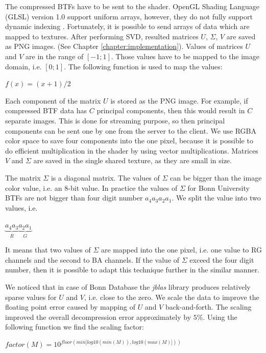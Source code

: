 The compressed BTFs  have to be sent to the shader. 
  OpenGL Shading Language (GLSL) version 1.0 support uniform arrays, however, they do not fully support dynamic indexing  \cite{glsl}.
Fortunately, it is possible to send arrays of data which are mapped to textures. 
After performing SVD, resulted matrices $U$, $\Sigma$, $V$ are saved as PNG images. (See Chapter \ref{chapter:implementation}).
Values of matrices $U$ and $V$ are in the range of $[-1;1]$.
 Those values have to be mapped to the image domain, i.e. $[0;1]$.
The following function is used to map the values:  

{\centering$f(x)=(x+1)/2$\\}


 Each component of the matrix $U$ is stored as the PNG image.
 For example, if compressed BTF data has $C$ principal components, then this would result in $C$ separate images.
 This is done for streaming purpose, so then principal components can be sent one by one from the server to the client.
 We use  RGBA color space to save four components into the one pixel, because it is possible to do efficient multiplication in the shader by using vector multiplications.
Matrices $V$ and $\Sigma$ are saved in the single shared texture, as they are small in size.

 The matrix $\Sigma$ is a diagonal matrix.
 The values of $\Sigma$ can be bigger than the image color value, i.e. an 8-bit value.
 In practice the values of $\Sigma$ for Bonn University BTFs \cite{btfBonn} are not bigger than four digit number $a_{4}a_{3}a_{2}a_{1}$.
We split the value into two values, i.e. 
 
{\centering$ \underbrace{a_{4}a_{3}}_{R} \underbrace{a_{2}a_{1}}_{G}$\\}
 
It means that two values of $\Sigma$ are mapped into the one pixel, i.e.  one value to RG  channels and the second to BA channels.
If the value of  $\Sigma$ exceed the four digit number, then it is possible to adapt this technique further in the similar manner.


We noticed that in case of Bonn Database \cite{btfBonn} the \emph{jblas} \cite{jblas} library produces relatively sparse values for $U$ and $V$, i.e. close to the zero.
 We scale the data to improve the floating point error caused by mapping of $U$ and $V$ back-and-forth.
The scaling improved the overall decompression error approximately by $5\%$.
 Using the following function we find the scaling factor:
 
 {\centering$ factor(M)=10^{floor(min[log10(min(M)),log10(max(M)]))}$ \\}
 
